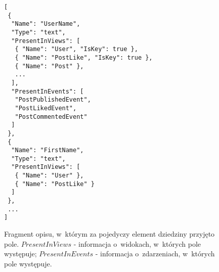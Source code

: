\begin{figure}[!ht]
\begin{verbatim}
[
 {
  "Name": "UserName",
  "Type": "text",
  "PresentInViews": [
   { "Name": "User", "IsKey": true },
   { "Name": "PostLike", "IsKey": true },
   { "Name": "Post" },
   ...
  ],
  "PresentInEvents": [
   "PostPublishedEvent",
   "PostLikedEvent",
   "PostCommentedEvent"
  ]
 },
 {
  "Name": "FirstName",
  "Type": "text",
  "PresentInViews": [
   { "Name": "User" },
   { "Name": "PostLike" }
  ]
 },
 ...
]
\end{verbatim}
\caption{
 Fragment opisu, w~którym za pojedyczy element dziedziny przyjęto pole.
 $PresentInViews$ - informacja o~widokach, w~których pole występuje; $PresentInEvents$ - informacja o~zdarzeniach, w~których pole występuje.
}
\label{fig:single:model_perField}
\end{figure}
